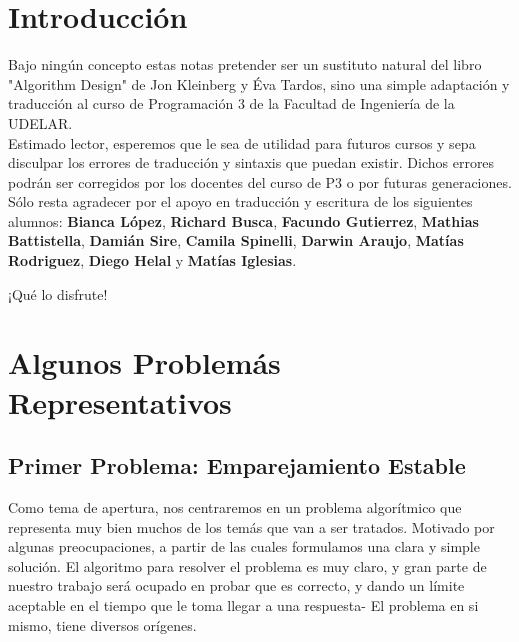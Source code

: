\documentclass[a4paper]{article}
\begin{document}
\newpage  
\tableofcontents
\newpage

\newpage





\section*{Introducción}

Bajo ningún concepto estas notas pretender ser un sustituto natural del libro "Algorithm Design" de Jon Kleinberg y Éva Tardos, sino una simple adaptación y traducción al curso de Programación 3 de la Facultad de Ingeniería de la UDELAR. \\

Estimado lector, esperemos que le sea de utilidad para futuros cursos y sepa disculpar los errores de traducción y sintaxis que puedan existir. Dichos errores podrán ser corregidos por los docentes del curso de P3 o por futuras generaciones.\\

Sólo resta agradecer por el apoyo en traducción y escritura de los siguientes alumnos: \textbf{Bianca López}, \textbf{Richard Busca}, \textbf{Facundo Gutierrez},\textbf{ Mathias Battistella}, \textbf{Damián Sire}, \textbf{Camila Spinelli}, \textbf{Darwin Araujo},  \textbf{Matías Rodriguez}, \textbf{Diego Helal} y \textbf{Matías Iglesias}. \\

\begin{center}
\huge{¡Qué lo disfrute!}
\end{center}



\newpage

\section{ Algunos Problemás Representativos}
\subsection{Primer Problema: Emparejamiento Estable}
Como tema de apertura, nos centraremos en un problema algorítmico que representa muy bien muchos de los temás que van a ser tratados. Motivado por algunas preocupaciones, a partir de las cuales formulamos una clara y simple solución. El algoritmo para resolver el problema es muy claro,  y gran parte de nuestro trabajo será ocupado en probar que es correcto, y dando un límite aceptable en el tiempo que le toma llegar a una respuesta- El problema en si mismo, tiene diversos orígenes.
\end{document}
